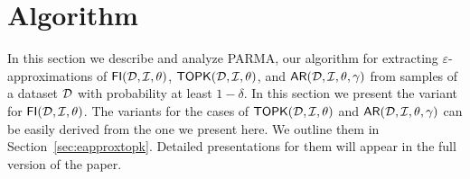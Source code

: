 \section{Algorithm}
\label{sec:parmaalgo}
In this section we describe and analyze PARMA, our algorithm for extracting
$\varepsilon$-approximations of $\mathsf{FI}({\cal D},{\cal I},\theta)$,
$\mathsf{TOPK}({\cal D},{\cal I},\theta)$, and $\mathsf{AR}({\cal D},{\cal I},\theta,\gamma)$ from samples of a dataset
${\cal D}$ with probability at least $1-\delta$. In this section we present the
variant for $\mathsf{FI}({\cal D},{\cal I},\theta)$. The variants for the cases of $\mathsf{TOPK}({\cal D},{\cal I},\theta)$ and
$\mathsf{AR}({\cal D},{\cal I},\theta,\gamma)$ can be easily derived from the one
we present here. We outline them in Section~\ref{sec:eapproxtopk}. Detailed
presentations for them will appear in the full version of the paper.

